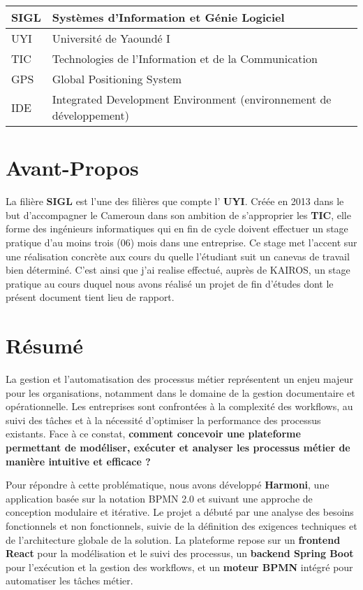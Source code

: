 \documentclass[12pt,a4paper,oneside]{extbook}
\begin{document}
\begin{table}[H]
\begin{adjustbox}{max width=\textwidth}
\begin{tabularx}{1.0\textwidth}{|l|X|}
     \hline
     SIGL & Systèmes d’Information et Génie Logiciel \\
     \hline
     UYI & Université de Yaoundé I \\
     \hline
     TIC & Technologies de l’Information et de la Communication \\
     \hline
     GPS & Global Positioning System \\
     \hline
     IDE & Integrated Development Environment (environnement de développement) \\
     \hline
   \end{tabularx}
   \end{adjustbox}
\end{table}

\newpage
\section*{Avant-Propos}
La filière  \textbf{SIGL} est l'une des filières que compte l' \textbf{UYI}. Créée en 2013 dans le but d'accompagner le Cameroun dans son ambition de s'approprier les  \textbf{TIC}, elle forme des ingénieurs  informatiques qui en fin de cycle doivent effectuer un stage pratique d'au moins trois (06) mois dans une entreprise. Ce stage met l'accent sur une réalisation concrète aux cours du quelle l'étudiant suit un canevas de travail bien déterminé. C'est ainsi que j'ai realise  effectué, auprès de KAIROS, un stage pratique au cours duquel nous avons réalisé un projet de fin d'études dont le présent document tient lieu de rapport.


\newpage
\newpage
{}
\section*{Résumé}

La gestion et l'automatisation des processus métier représentent un enjeu majeur pour les organisations, notamment dans le domaine de la gestion documentaire et opérationnelle. Les entreprises sont confrontées à la complexité des workflows, au suivi des tâches et à la nécessité d'optimiser la performance des processus existants. Face à ce constat, \textbf{comment concevoir une plateforme permettant de modéliser, exécuter et analyser les processus métier de manière intuitive et efficace ?}  

Pour répondre à cette problématique, nous avons développé \textbf{Harmoni}, une application basée sur la notation BPMN 2.0 et suivant une approche de conception modulaire et itérative. Le projet a débuté par une analyse des besoins fonctionnels et non fonctionnels, suivie de la définition des exigences techniques et de l'architecture globale de la solution. La plateforme repose sur un \textbf{frontend React} pour la modélisation et le suivi des processus, un \textbf{backend Spring Boot} pour l’exécution et la gestion des workflows, et un \textbf{moteur BPMN} intégré pour automatiser les tâches métier.  
\end{document}
